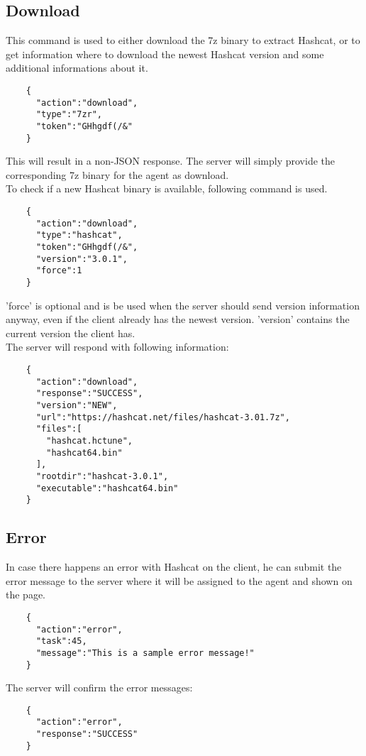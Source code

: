 \documentclass{article}
\begin{document}
	\subsection*{Download}
	This command is used to either download the 7z binary to extract Hashcat, or to get information where to download the newest Hashcat version and some additional informations about it.
	\begin{verbatim}
	{
	  "action":"download",
	  "type":"7zr",
	  "token":"GHhgdf(/&"
	}
	\end{verbatim}
	This will result in a non-JSON response. The server will simply provide the corresponding 7z binary for the agent as download.\\
	To check if a new Hashcat binary is available, following command is used.
	\begin{verbatim}
	{
	  "action":"download",
	  "type":"hashcat",
	  "token":"GHhgdf(/&",
	  "version":"3.0.1",
	  "force":1
	}
	\end{verbatim}
	'force' is optional and is be used when the server should send version information anyway, even if the client already has the newest version. 'version' contains the current version the client has.\\
	The server will respond with following information:
	\begin{verbatim}
	{
	  "action":"download",
	  "response":"SUCCESS",
	  "version":"NEW",
	  "url":"https://hashcat.net/files/hashcat-3.01.7z",
	  "files":[
	    "hashcat.hctune",
	    "hashcat64.bin"
	  ],
	  "rootdir":"hashcat-3.0.1",
	  "executable":"hashcat64.bin"
	}
	\end{verbatim}
	
	\subsection*{Error}
	In case there happens an error with Hashcat on the client, he can submit the error message to the server where it will be assigned to the agent and shown on the page.
	\begin{verbatim}
	{
	  "action":"error",
	  "task":45,
	  "message":"This is a sample error message!"
	}
	\end{verbatim}
	The server will confirm the error messages:
	\begin{verbatim}
	{
	  "action":"error",
	  "response":"SUCCESS"
	}
	\end{verbatim}
\end{document}
